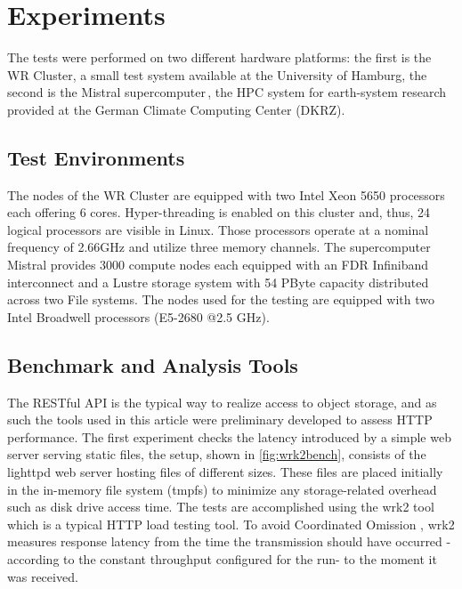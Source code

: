 \documentclass[runningheads]{llncs}
\begin{document}
\section{Experiments}
\label{sec:experiments}

The tests were performed on two different hardware platforms: the first is the WR Cluster, a small test system available at the University of Hamburg, the second is the Mistral supercomputer\,\cite{mistral}, the HPC system for earth-system research provided at the German Climate Computing Center (DKRZ).


\subsection{Test Environments}
The nodes of the WR Cluster are equipped with two Intel Xeon 5650 processors each offering 6 cores. Hyper-threading is enabled on this cluster and, thus, 24 logical processors are visible in Linux. Those processors operate at a nominal frequency of 2.66GHz and utilize three memory channels.
The supercomputer Mistral \cite{mistral} provides 3000 compute nodes each equipped with an FDR Infiniband interconnect and a Lustre storage system with 54 PByte capacity distributed across two File systems. The nodes used for the testing are equipped with two Intel Broadwell processors (E5-2680 @2.5 GHz).


\subsection{Benchmark and Analysis Tools}\label{subsec:benchmark1}

The RESTful API is the typical way to realize access to object storage, and as such the tools used in this article were preliminary developed to assess HTTP performance.
The first experiment checks the latency introduced by a simple web server serving static files, the setup, shown in \cref{fig:wrk2bench}, consists of the lighttpd web server \cite{lighttpd} hosting files of different sizes. These files are placed initially in the in-memory file system (tmpfs) to minimize any storage-related overhead such as disk drive access time. The tests are accomplished using the wrk2 tool \cite{wrk2URL} which is a typical HTTP load testing tool. To avoid Coordinated Omission \cite{wrk2URL}, wrk2 measures response latency from the time the transmission should have occurred - according to the constant throughput configured for the run- to the moment it was received.
\end{document}
